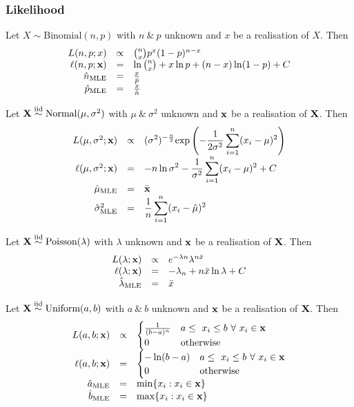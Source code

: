 \documentclass[11pt,a4paper]{article}
\begin{document}
\subsubsection{Likelihood}

Let $X\sim\text{Binomial}(n,p)$ with $n\ \&\ p$ unknown and $x$ be a realisation of $X$. Then
\[\begin{array}{rcl}
L(n,p;x)&\propto&{n\choose x}p^x(1-p)^{n-x}\\
\ell(n,p;\textbf{x})&=&\ln{n\choose x}+x\ln p+(n-x)\ln(1-p)+C\\
\hat{n}_\text{MLE}&=&\frac{x}{\hat{p}}\\
\hat{p}_\text{MLE}&=&\frac{x}{\hat{n}}\\
\end{array}\]

Let $\textbf{X}\overset{\text{iid}}{\sim}\text{Normal}(\mu,\sigma^2)$ with $\mu\ \&\ \sigma^2$ unknown and $\textbf{x}$ be a realisation of $\textbf{X}$. Then
\[\begin{array}{rcl}
L(\mu,\sigma^2;\textbf{x})&\propto&{\displaystyle(\sigma^2)^{-\frac{n}{2}}\text{exp}\left(-\frac{1}{2\sigma^2}\sum_{i=1}^n(x_i-\mu)^2\right)}\\
\ell(\mu,\sigma^2;\textbf{x})&=&{\displaystyle-n\ln\sigma^2-\frac{1}{\sigma^2}\sum_{i=1}^n(x_i-\mu)^2}+C\\
\hat{\mu}_\text{MLE}&=&\bar{\textbf{x}}\\
\hat{\sigma}^2_\text{MLE}&=&{\displaystyle\frac{1}{n}\sum_{i=1}^n(x_i-\hat\mu)^2}\\
\end{array}\]

Let $\textbf{X}\overset{\text{iid}}{\sim}\text{Poisson}(\lambda)$ with $\lambda$ unknown and $\textbf{x}$ be a realisation of $\textbf{X}$. Then
\[\begin{array}{rcl}
L(\lambda;\textbf{x})&\propto&e^{-\lambda n}\lambda^{n\bar{x}}\\
\ell(\lambda;\textbf{x})&=&-\lambda_n+n\bar{x}\ln\lambda+C\\
\hat\lambda_\text{MLE}&=&\bar{x}
\end{array}\]

Let $\textbf{X}\overset{\text{iid}}{\sim}\text{Uniform}(a,b)$ with $a\ \&\ b$ unknown and $\textbf{x}$ be a realisation of $\textbf{X}$. Then
\[\begin{array}{rcl}
L(a,b;\x)&\propto&\begin{cases}\frac{1}{(b-a)^n}&a\leq\ x_i\leq b\ \forall\ x_i\in\x\\0&\text{otherwise}\end{cases}\\
\ell(a,b;\x)&=&\begin{cases}-\ln(b-a)&a\leq\ x_i\leq b\ \forall\ x_i\in\x\\0&\text{otherwise}\end{cases}\\
\hat{a}_\text{MLE}&=&\min\{x_i:x_i\in\x\}\\
\hat{b}_\text{MLE}&=&\max\{x_i:x_i\in\x\}
\end{array}\]
\end{document}
